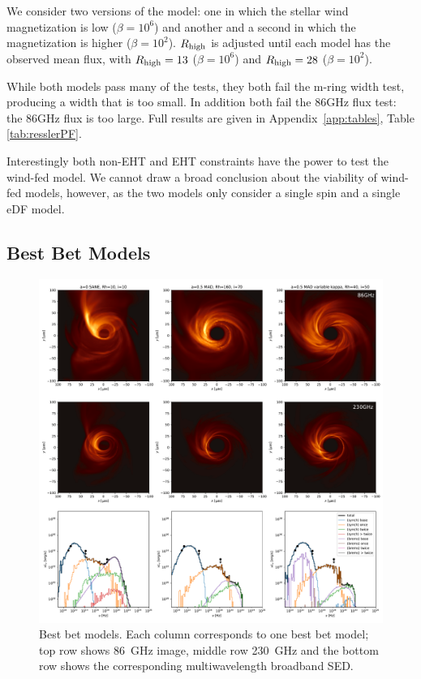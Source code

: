 We consider two versions of the model: one in which the stellar wind magnetization is low ($\beta = 10^6$) and another and a second in which the magnetization is higher ($\beta = 10^2$). $R_\mathrm{high}$ is adjusted until each model has the observed mean flux, with $R_\mathrm{high} = 13$ ($\beta = 10^6$) and $R_\mathrm{high} = 28$ ($\beta = 10^2$).

While both models pass many of the tests, they both fail the m-ring width test, producing a width that is too small.  In addition both fail the 86GHz flux test: the 86GHz flux is too large. Full results are given in Appendix~\ref{app:tables}, Table \ref{tab:resslerPF}.

Interestingly both non-EHT and EHT constraints have the power to test the wind-fed model.  We cannot draw a broad conclusion about the viability of wind-fed models, however, as the two models only consider a single spin and a single eDF model.

\subsection{Best Bet Models}

\begin{figure}
  \centering
  \includegraphics[width=\textwidth]{figures/bestbet.pdf}
  \caption{Best bet models.  Each column corresponds to one best bet model; top row shows 86~GHz image, middle row 230~GHz and the bottom row shows the corresponding multiwavelength broadband SED.} \label{fig:bestbet}
\end{figure}

